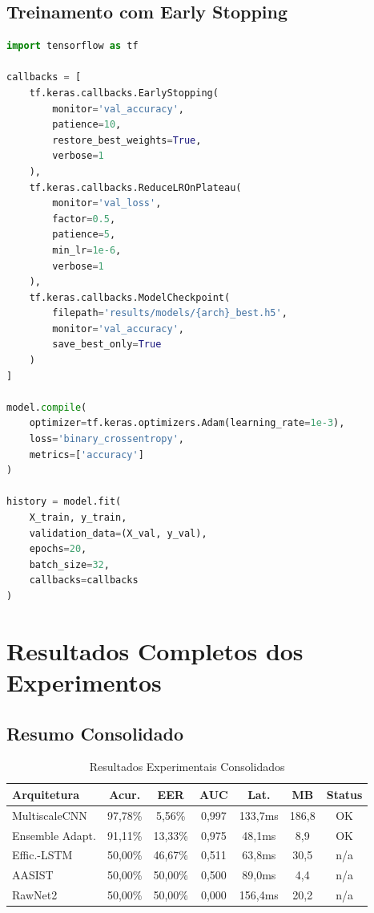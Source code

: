 \documentclass[12pt,a4paper]{article}
\begin{document}
\subsection{Treinamento com Early Stopping}

\begin{lstlisting}[language=Python,
caption={Loop de Treinamento com Early Stopping e ReduceLROnPlateau}]
import tensorflow as tf

callbacks = [
    tf.keras.callbacks.EarlyStopping(
        monitor='val_accuracy',
        patience=10,
        restore_best_weights=True,
        verbose=1
    ),
    tf.keras.callbacks.ReduceLROnPlateau(
        monitor='val_loss',
        factor=0.5,
        patience=5,
        min_lr=1e-6,
        verbose=1
    ),
    tf.keras.callbacks.ModelCheckpoint(
        filepath='results/models/{arch}_best.h5',
        monitor='val_accuracy',
        save_best_only=True
    )
]

model.compile(
    optimizer=tf.keras.optimizers.Adam(learning_rate=1e-3),
    loss='binary_crossentropy',
    metrics=['accuracy']
)

history = model.fit(
    X_train, y_train,
    validation_data=(X_val, y_val),
    epochs=20,
    batch_size=32,
    callbacks=callbacks
)
\end{lstlisting}

\section{Resultados Completos dos Experimentos}

\subsection{Resumo Consolidado}

\begin{table}[H]
\centering
\caption{Resultados Experimentais Consolidados}
\small
\begin{tabular}{lcccccc}
\toprule
\textbf{Arquitetura} & \textbf{Acur.} & \textbf{EER} & \textbf{AUC} &
\textbf{Lat.} & \textbf{MB} & \textbf{Status} \\
\midrule
MultiscaleCNN & 97,78\% & 5,56\% & 0,997 & 133,7ms & 186,8 & OK \\
Ensemble Adapt. & 91,11\% & 13,33\% & 0,975 & 48,1ms & 8,9 & OK \\
Effic.-LSTM & 50,00\% & 46,67\% & 0,511 & 63,8ms & 30,5 & n/a \\
AASIST & 50,00\% & 50,00\% & 0,500 & 89,0ms & 4,4 & n/a \\
RawNet2 & 50,00\% & 50,00\% & 0,000 & 156,4ms & 20,2 & n/a \\
\bottomrule
\end{tabular}
\end{table}
\end{document}
